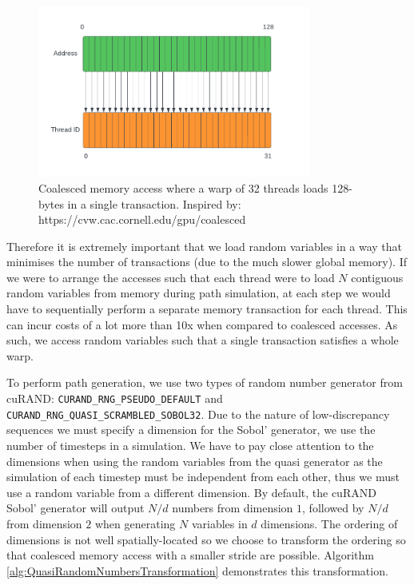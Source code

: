 \begin{figure}[h]
    \centering
    \includegraphics[width=0.8\textwidth]{figures/coalesced access.pdf}
    \caption{Coalesced memory access where a warp of 32 threads loads 128-bytes in a single transaction. Inspired by: https://cvw.cac.cornell.edu/gpu/coalesced}
    \label{fig:coalescedaccess}
\end{figure}

Therefore it is extremely important that we load random variables in a way that minimises the number of transactions (due to the much slower global memory). If we were to arrange the accesses such that each thread were to load $N$ contiguous random variables from memory during path simulation, at each step we would have to sequentially perform a separate memory transaction for each thread. This can incur costs of a lot more than 10x when compared to coalesced accesses. As such, we access random variables such that a single transaction satisfies a whole warp.


To perform path generation, we use two types of random number generator from cuRAND: \texttt{CURAND_RNG_PSEUDO_DEFAULT} and \texttt{CURAND_RNG_QUASI_SCRAMBLED_SOBOL32}. Due to the nature of low-discrepancy sequences we must specify a dimension for the Sobol' generator, we use the number of timesteps in a simulation. We have to pay close attention to the dimensions when using the random variables from the quasi generator as the simulation of each timestep must be independent from each other, thus we must use a random variable from a different dimension. By default, the cuRAND Sobol' generator will output $N/d$ numbers from dimension $1$, followed by $N/d$ from dimension $2$ when generating $N$ variables in $d$ dimensions. The ordering of dimensions is not well spatially-located so we choose to transform the ordering so that coalesced memory access with a smaller stride are possible. Algorithm \ref{alg:QuasiRandomNumbersTransformation} demonstrates this transformation.

